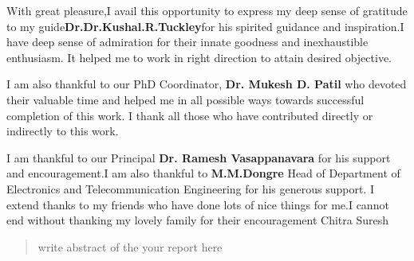 \begin{center}
{%
%
%
%
%
%
%
%



\begin{acknowledgments}
With great pleasure,I avail this opportunity to express my deep
sense of gratitude to my guide\textbf{Dr.Dr.Kushal.R.Tuckley}for his spirited guidance
and inspiration.I have deep sense of admiration for their innate
goodness and inexhaustible enthusiasm. It helped me to work in right
direction to attain desired objective.

I am also thankful to our PhD Coordinator,\textbf{ Dr. Mukesh D. Patil} who devoted their
valuable time and helped me in all possible ways towards successful
completion of this work. I thank all those who have contributed
directly or indirectly to this work.

I am thankful to our Principal \textbf{Dr. Ramesh Vasappanavara} for his support and
encouragement.I am also thankful to \textbf{M.M.Dongre} Head of Department of Electronics and Telecommunication Engineering for his generous support.
I extend thanks to my friends who have done lots of
nice things for me.I cannot end without thanking my lovely family
for their encouragement
Chitra Suresh
\end{acknowledgments}

\begin{abstract}

write abstract of the your report here


\end{abstract}

}
\end{center}

